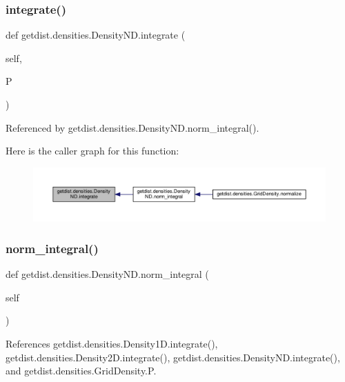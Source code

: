 \subsubsection{\texorpdfstring{integrate()}{integrate()}}
{\footnotesize\ttfamily def getdist.\+densities.\+Density\+N\+D.\+integrate (\begin{DoxyParamCaption}\item[{}]{self,  }\item[{}]{P }\end{DoxyParamCaption})}



Referenced by getdist.\+densities.\+Density\+N\+D.\+norm\+\_\+integral().

Here is the caller graph for this function\+:
\nopagebreak
\begin{figure}[H]
\begin{center}
\leavevmode
\includegraphics[width=350pt]{classgetdist_1_1densities_1_1DensityND_a3fb464e026c38d7c6d6b7ae399f6ebfa_icgraph}
\end{center}
\end{figure}
\mbox{\label{classgetdist_1_1densities_1_1DensityND_a6967eace9747b5521051c675036db2d8}} 
\subsubsection{\texorpdfstring{norm\+\_\+integral()}{norm\_integral()}}
{\footnotesize\ttfamily def getdist.\+densities.\+Density\+N\+D.\+norm\+\_\+integral (\begin{DoxyParamCaption}\item[{}]{self }\end{DoxyParamCaption})}



References getdist.\+densities.\+Density1\+D.\+integrate(), getdist.\+densities.\+Density2\+D.\+integrate(), getdist.\+densities.\+Density\+N\+D.\+integrate(), and getdist.\+densities.\+Grid\+Density.\+P.



